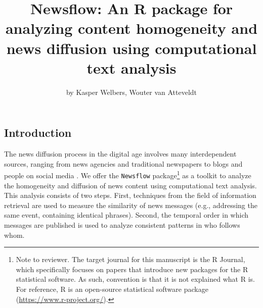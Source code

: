 \title{Newsflow: An R package for analyzing content homogeneity and news
diffusion using computational text analysis}
\author{by Kasper Welbers, Wouter van Atteveldt}

\maketitle


\subsection{Introduction}\label{introduction}

The news diffusion process in the digital age involves many
interdependent sources, ranging from news agencies and traditional
newspapers to blogs and people on social media
\citep{meraz11, paterson05, pew10}. We offer the \texttt{Newsflow}
package\footnote{Note to reviewer. The target journal for this
  manuscript is the R Journal, which specifically focuses on papers that
  introduce new packages for the R statistical software. As such,
  convention is that it is not explained what R is. For reference, R is
  an open-source statistical software package
  (\url{https://www.r-project.org/}).} as a toolkit to analyze the
homogeneity and diffusion of news content using computational text
analysis. This analysis consists of two steps. First, techniques from
the field of information retrieval are used to measure the similarity of
news messages (e.g., addressing the same event, containing identical
phrases). Second, the temporal order in which messages are published is
used to analyze consistent patterns in who follows whom.

